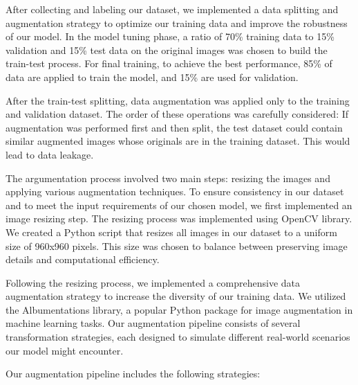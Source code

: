  After collecting and labeling our dataset, we implemented a data splitting and augmentation strategy to optimize our training data and improve the robustness of our model.
In the model tuning phase, a ratio of 70\% training data to 15\% validation and 15\% test data on the original images was chosen to build the train-test process. For final training, to achieve the best performance, 85\% of data are applied to train the model, and 15\% are used for validation.

After the train-test splitting, data augmentation was applied only to the training and validation dataset.
The order of these operations was carefully considered: If augmentation was performed first and then split, the test dataset could contain similar augmented images whose originals are in the training dataset. This would lead to data leakage.

The argumentation process involved two main steps: resizing the images and applying various augmentation techniques. To ensure consistency in our dataset and to meet the input requirements of our chosen model, we first implemented an image resizing step. The resizing process was implemented using OpenCV library. We created a Python script that resizes all images in our dataset to a uniform size of 960x960 pixels. This size was chosen to balance between preserving image details and computational efficiency.

Following the resizing process, we implemented a comprehensive data augmentation strategy to increase the diversity of our training data. We utilized the Albumentations library, a popular Python package for image augmentation in machine learning tasks. Our augmentation pipeline consists of several transformation strategies, each designed to simulate different real-world scenarios our model might encounter.

Our augmentation pipeline includes the following strategies:

